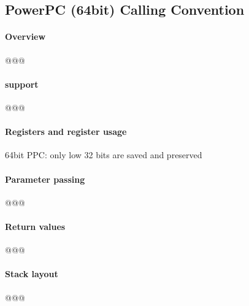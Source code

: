 \subsection{PowerPC (64bit) Calling Convention}



\paragraph{Overview}

@@@


\paragraph{ support}

@@@


\paragraph{Registers and register usage}

64bit PPC: only low 32 bits are saved and preserved


\paragraph{Parameter passing}

@@@


\paragraph{Return values}

@@@


\paragraph{Stack layout}

@@@

